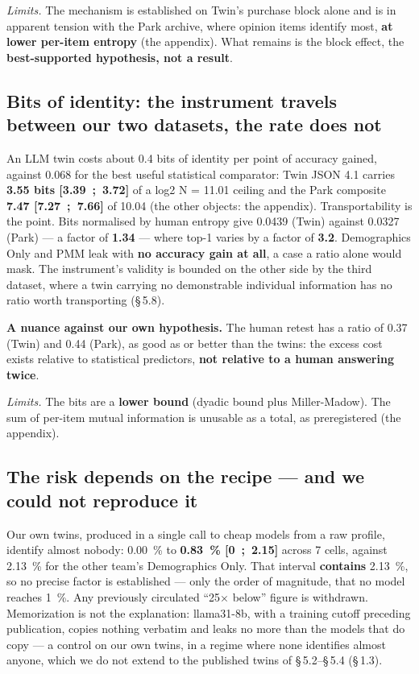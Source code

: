 \documentclass[sigconf,anonymous,review]{acmart}
\begin{document}
\textit{Limits.} The mechanism is established on Twin's purchase block alone and is in apparent tension with the Park archive, where opinion items identify most, \textbf{at lower per-item entropy} (the appendix). What remains is the block effect, the \textbf{best-supported hypothesis, not a result}.

\subsection{Bits of identity: the instrument travels between our two datasets, the rate does not}

An LLM twin costs about 0.4 bits of identity per point of accuracy gained, against 0.068 for the best useful statistical comparator: Twin JSON 4.1 carries \textbf{3.55 bits [3.39~;~3.72]} of a log2 N = 11.01 ceiling and the Park composite \textbf{7.47 [7.27~;~7.66]} of 10.04 (the other objects: the appendix). Transportability is the point. Bits normalised by human entropy give 0.0439 (Twin) against 0.0327 (Park) --- a factor of \textbf{1.34} --- where top-1 varies by a factor of \textbf{3.2}. Demographics Only and PMM leak with \textbf{no accuracy gain at all}, a case a ratio alone would mask. The instrument's validity is bounded on the other side by the third dataset, where a twin carrying no demonstrable individual information has no ratio worth transporting (\S\,5.8).

\textbf{A nuance against our own hypothesis.} The human retest has a ratio of 0.37 (Twin) and 0.44 (Park), as good as or better than the twins: the excess cost exists relative to statistical predictors, \textbf{not relative to a human answering twice}.

\textit{Limits.} The bits are a \textbf{lower bound} (dyadic bound plus Miller-Madow). The sum of per-item mutual information is unusable as a total, as preregistered (the appendix).

\subsection{The risk depends on the recipe --- and we could not reproduce it}

Our own twins, produced in a single call to cheap models from a raw profile, identify almost nobody: 0.00~\% to \textbf{0.83~\% [0~;~2.15]} across 7 cells, against 2.13~\% for the other team's Demographics Only. That interval \textbf{contains} 2.13~\%, so no precise factor is established --- only the order of magnitude, that no model reaches 1~\%. Any previously circulated ``25$\times$ below'' figure is withdrawn. Memorization is not the explanation: llama31-8b, with a training cutoff preceding publication, copies nothing verbatim and leaks no more than the models that do copy --- a control on our own twins, in a regime where none identifies almost anyone, which we do not extend to the published twins of \S\,5.2--\S\,5.4 (\S\,1.3).
\end{document}
